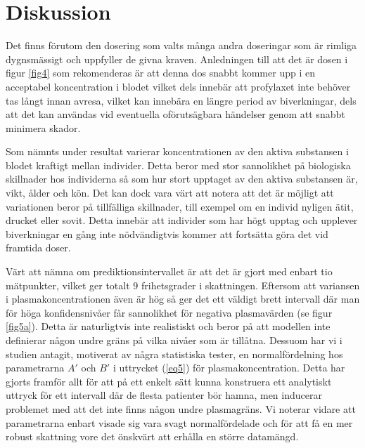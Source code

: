 \documentclass[a4paper,11pt]{article}
\begin{document}
\section{Diskussion}
Det finns förutom den dosering som valts många andra doseringar som är rimliga dygnsmässigt och uppfyller de givna  kraven. Anledningen till att det är dosen i figur \ref{fig4} som rekomenderas är att denna dos snabbt kommer upp i en acceptabel koncentration i blodet vilket dels innebär att profylaxet inte behöver tas långt innan avresa, vilket kan innebära en längre period av biverkningar, dels att det kan användas vid eventuella oförutsägbara händelser genom att snabbt minimera skador. 

Som nämnts under resultat varierar koncentrationen av den aktiva substansen i blodet kraftigt mellan individer. Detta beror med stor sannolikhet på biologiska skillnader hos individerna så som hur stort upptaget av den aktiva substansen är, vikt, ålder och kön. Det kan dock vara värt att notera att det är möjligt att variationen beror på tillfälliga skillnader, till exempel om en individ nyligen ätit, drucket eller sovit. Detta innebär att individer som har högt upptag och upplever biverkningar en gång inte nödvändigtvis kommer att fortsätta göra det vid framtida doser. 





Värt att nämna om prediktionsintervallet är att det är gjort med enbart tio mätpunkter, vilket ger totalt $9$ frihetsgrader i skattningen. Eftersom att variansen i plasmakoncentrationen även är hög så ger det ett väldigt brett intervall där man för höga konfidensnivåer får sannolikhet för negativa plasmavärden (se figur \ref{fig5a}). Detta är naturligtvis inte realistiskt och beror på att modellen inte definierar någon undre gräns på vilka nivåer som är tillåtna. Dessuom har vi i studien antagit, motiverat av några statistiska tester, en normalfördelning hos parametrarna $A'$ och $B'$ i uttrycket (\ref{eq5}) för plasmakoncentration. Detta har gjorts framför allt för att på ett enkelt sätt kunna konstruera ett analytiskt uttryck för ett intervall där de flesta patienter bör hamna, men inducerar problemet med att det inte finns någon undre plasmagräns. Vi noterar vidare att parametrarna enbart visade sig vara svagt normalfördelade och för att få en mer robust skattning vore det önskvärt att erhålla en större datamängd.    
\end{document}
